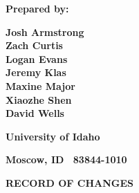 \documentclass[twoside,letterpaper]{article}
\begin{document}
\bigskip


\bigskip

{\centering{}\bfseries\color{black}
Prepared by:
\par}

{\centering{}\bfseries\color{black}
Josh Armstrong
\\Zach Curtis
\\Logan Evans
\\Jeremy Klas
\\Maxine Major
\\Xiaozhe Shen
\\David Wells

\par}

{\centering{}\bfseries\color{black}
University of Idaho
\par}

{\centering{}\bfseries\color{black}
Moscow, ID \ 83844-1010
\par}



\bigskip

{\centering{}\bfseries\color{black}
RECORD OF CHANGES
\par}


\bigskip
\end{document}
